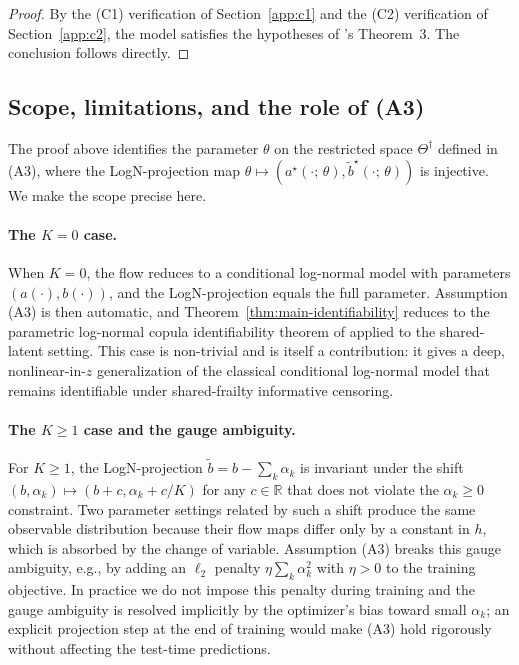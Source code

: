 \begin{proof}
By the (C1) verification of Section~\ref{app:c1} and the (C2)
verification of Section~\ref{app:c2}, the model satisfies the hypotheses
of \citet{czado2023dependent}'s Theorem~3. The conclusion follows
directly.
\end{proof}

\subsection{Scope, limitations, and the role of (A3)}
\label{app:scope}

The proof above identifies the parameter $\theta$ on the restricted
space $\Theta^\dagger$ defined in (A3), where the LogN-projection map
$\theta \mapsto (a^\star(\cdot;\, \theta), \widetilde{b}^\star(\cdot;\, \theta))$
is injective. We make the scope precise here.

\paragraph{The $K = 0$ case.}
When $K = 0$, the flow reduces to a conditional log-normal model with
parameters $(a(\cdot), b(\cdot))$, and the LogN-projection equals the
full parameter. Assumption (A3) is then automatic, and
Theorem~\ref{thm:main-identifiability} reduces to the parametric
log-normal copula identifiability theorem of \citet{czado2023dependent}
applied to the shared-latent setting. This case is non-trivial and is
itself a contribution: it gives a deep, nonlinear-in-$z$
generalization of the classical conditional log-normal model that
remains identifiable under shared-frailty informative censoring.

\paragraph{The $K \ge 1$ case and the gauge ambiguity.}
For $K \ge 1$, the LogN-projection $\widetilde{b} = b - \sum_k \alpha_k$
is invariant under the shift
$(b, \alpha_k) \mapsto (b + c, \alpha_k + c/K)$ for any $c \in \mathbb{R}$
that does not violate the $\alpha_k \ge 0$ constraint. Two parameter
settings related by such a shift produce the same observable
distribution because their flow maps differ only by a constant in $h$,
which is absorbed by the change of variable. Assumption (A3) breaks this
gauge ambiguity, e.g., by adding an $\ell_2$ penalty
$\eta \sum_k \alpha_k^2$ with $\eta > 0$ to the training objective. In
practice we do not impose this penalty during training and the gauge
ambiguity is resolved implicitly by the optimizer's bias toward small
$\alpha_k$; an explicit projection step at the end of training would
make (A3) hold rigorously without affecting the test-time predictions.

